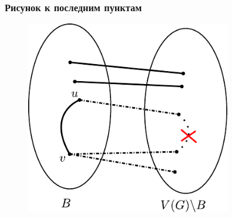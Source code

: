 \begin{frame}[t]
    \frametitle{Рисунок к последним пунктам}
    
    \begin{figure}[h]
        \centering
        \includegraphics[width=0.8\textwidth]{images/restore}
        \label{fig:restore}
    \end{figure}
\end{frame}
